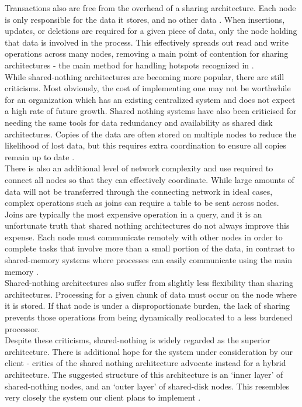 \documentclass[onecolumn, draftclsnofoot,10pt, compsoc]{IEEEtran}
\begin{document}
\indent Transactions also are free from the overhead of a sharing architecture. Each node is only responsible for the data it stores, and no other data \cite{GerardPP}. When insertions, updates, or deletions are required for a given piece of data, only the node holding that data is involved in the process. This effectively spreads out read and write operations across many nodes, removing a main point of contention for sharing architectures - the main method for handling hotspots recognized in \cite{BerkeleySN}. \\

\indent While shared-nothing architectures are becoming more popular, there are still criticisms. Most obviously, the cost of implementing one may not be worthwhile for an organization which has an existing centralized system and does not expect a high rate of future growth. Shared nothing systems have also been criticised for needing the same tools for data redundancy and availability as shared disk architectures. Copies of the data are often stored on multiple nodes to reduce the likelihood of lost data, but this requires extra coordination to ensure all copies remain up to date \cite{HDFSArchitecture}. \\

\indent There is also an additional level of network complexity and use required to connect all nodes so that they can effectively coordinate. While large amounts of data will not be transferred through the connecting network in ideal cases, complex operations such as joins can require a table to be sent across nodes. Joins are typically the most expensive operation in a query, and it is an unfortunate truth that shared nothing architectures do not always improve this expense. Each node must communicate remotely with other nodes in order to complete tasks that involve more than a small portion of the data, in contrast to shared-memory systems where processes can easily communicate using the main memory \cite{MuchAdo}. \\

\indent Shared-nothing architectures also suffer from slightly less flexibility than sharing architectures. Processing for a given chunk of data must occur on the node where it is stored. If that node is under a disproportionate burden, the lack of sharing prevents those operations from being dynamically reallocated to a less burdened processor. \\

\indent Despite these criticisms, shared-nothing is widely regarded as the superior architecture. There is additional hope for the system under consideration by our client - critics of the shared nothing architecture advocate instead for a hybrid architecture. The suggested structure of this architecture is an ‘inner layer’ of shared-nothing nodes, and an ‘outer layer’ of shared-disk nodes. This resembles very closely the system our client plans to implement \cite{MuchAdo}.\\
\end{document}
